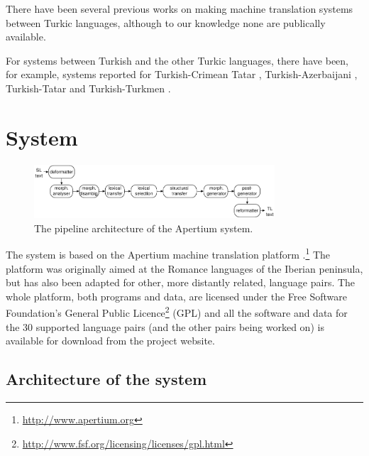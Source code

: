 \documentclass[11pt,a4paper]{article}
\begin{document}
There have been several previous works on making machine translation systems between 
Turkic languages, although to our knowledge none are publically available. 

For systems between Turkish and the other Turkic languages, there have been, 
for example, systems reported for Turkish-Crimean Tatar \cite{altintas01}, Turkish-Azerbaijani \cite{hamzaoglu93}, Turkish-Tatar \cite{suleymanov08} and Turkish-Turkmen \cite{tantug07}. 

\section{System}
\label{sec:sys}

\begin{figure}
\begin{center}
 \includegraphics[width=0.8\textwidth]{architecture.pdf}
\end{center}
\caption{The pipeline architecture of the Apertium system.}
\label{fig:modules}
\end{figure}

The system is based on the Apertium machine translation 
platform \cite{apertium/2011}.\footnote{\url{http://www.apertium.org}} The 
platform was originally aimed at the Romance languages of the Iberian peninsula, but has also been adapted for 
other, more distantly related, language pairs.
The whole platform, both programs and data, are licensed under the Free Software Foundation's General Public 
Licence\footnote{\url{http://www.fsf.org/licensing/licenses/gpl.html}} (GPL) and all the software and data for the 
30 supported language pairs (and the other pairs being worked on) is available for download from the project 
website.

\subsection{Architecture of the system}
\end{document}
